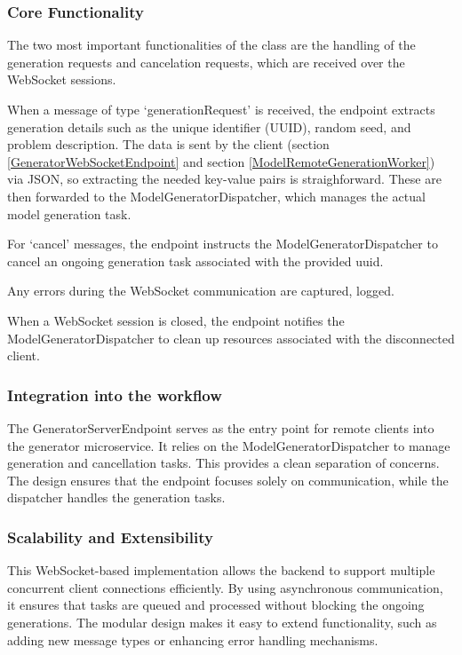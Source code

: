 			\subsubsection{Core Functionality} \label{Core Functionality}
				The two most important functionalities of the class are the handling of the generation requests and cancelation requests, which are
				 received over the 
				WebSocket sessions. 
				
				When a message of type `generationRequest' is received, the endpoint extracts generation details 
				such as the unique identifier (UUID), random seed, and problem description. The data is sent by the client (section \ref{GeneratorWebSocketEndpoint} 
				and section \ref{ModelRemoteGenerationWorker}) via JSON, so extracting the
				needed key-value pairs is straighforward. These are then forwarded to the ModelGeneratorDispatcher, 
				which manages the actual model generation task.

				\label{serverendpointcancel}For `cancel' messages, the endpoint instructs the ModelGeneratorDispatcher to cancel an ongoing generation task associated with the provided uuid.

				Any errors during the WebSocket communication are captured, logged.

				When a WebSocket session is closed, the endpoint notifies the ModelGeneratorDispatcher to clean up resources associated with the disconnected client.

			\subsubsection{Integration into the workflow} \label{Integration into the workflow}
				The GeneratorServerEndpoint serves as the entry point for remote clients into the generator microservice. 
				It relies on the ModelGeneratorDispatcher to manage generation and cancellation tasks. This provides a clean separation of concerns. 
				The design ensures that the endpoint focuses solely on communication, while the dispatcher handles the generation tasks.

			\subsubsection{Scalability and Extensibility} \label{Scalability and Extensibility}
				This WebSocket-based implementation allows the backend to support multiple concurrent client connections efficiently. 
				By using asynchronous communication, it ensures that tasks are queued and processed without blocking the ongoing generations. 
				The modular design makes it easy to extend functionality, such as adding new message types or enhancing error handling mechanisms.



